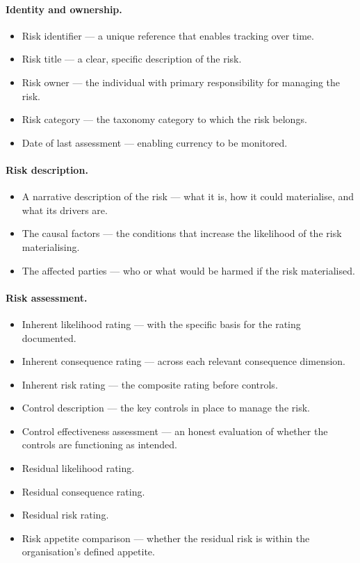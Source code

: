 \paragraph{\textbf{Identity and ownership}.}
\begin{itemize}
  \item{Risk identifier — a unique reference that enables tracking over time.}
  \item{Risk title — a clear, specific description of the risk.}
  \item{Risk owner — the individual with primary responsibility for managing the risk.}
  \item{Risk category — the taxonomy category to which the risk belongs.}
  \item{Date of last assessment — enabling currency to be monitored.}
\end{itemize}

\paragraph{\textbf{Risk description}.}
\begin{itemize}
  \item{A narrative description of the risk — what it is, how it could materialise, and what its drivers are.}
  \item{The causal factors — the conditions that increase the likelihood of the risk materialising.}
  \item{The affected parties — who or what would be harmed if the risk materialised.}
\end{itemize}

\paragraph{\textbf{Risk assessment}.}
\begin{itemize}
  \item{Inherent likelihood rating — with the specific basis for the rating documented.}
  \item{Inherent consequence rating — across each relevant consequence dimension.}
  \item{Inherent risk rating — the composite rating before controls.}
  \item{Control description — the key controls in place to manage the risk.}
  \item{Control effectiveness assessment — an honest evaluation of whether the controls are functioning as intended.}
  \item{Residual likelihood rating.}
  \item{Residual consequence rating.}
  \item{Residual risk rating.}
  \item{Risk appetite comparison — whether the residual risk is within the organisation's defined appetite.}
\end{itemize}

